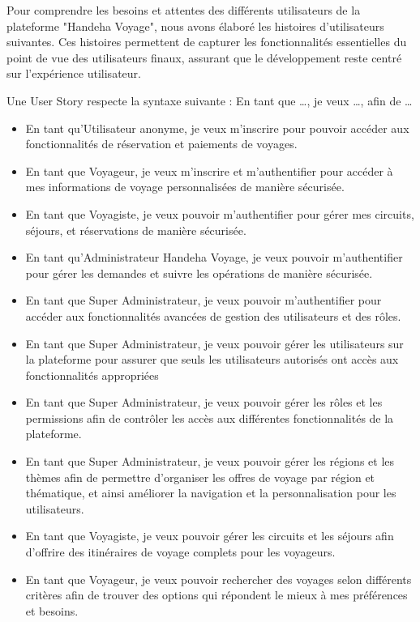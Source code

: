 \documentclass[12pt]{report}
\begin{document}
				\hspace{15pt} Pour comprendre les besoins et attentes des différents utilisateurs de la plateforme "Handeha Voyage", nous avons élaboré les histoires d’utilisateurs suivantes. Ces histoires permettent de capturer les fonctionnalités essentielles du point de vue des utilisateurs finaux, assurant que le développement reste centré sur l’expérience utilisateur. 

				Une User Story respecte la syntaxe suivante : En tant que …, je veux …, afin de …


				\begin{itemize}
					\item En tant qu'Utilisateur anonyme, je veux m'inscrire pour pouvoir accéder aux fonctionnalités de réservation et paiements de voyages. 
					\item En tant que Voyageur, je veux m'inscrire et m'authentifier pour accéder à mes informations de voyage personnalisées de manière sécurisée.
					\item En tant que Voyagiste, je veux pouvoir m'authentifier pour gérer mes circuits, séjours, et réservations de manière sécurisée.
					\item En tant qu'Administrateur Handeha Voyage, je veux pouvoir m'authentifier pour gérer les demandes et suivre les opérations de manière sécurisée.
					\item En tant que Super Administrateur, je veux pouvoir m'authentifier pour accéder aux fonctionnalités avancées de gestion des utilisateurs et des rôles.
					\item En tant que Super Administrateur, je veux pouvoir gérer les utilisateurs sur la plateforme pour assurer que seuls les utilisateurs autorisés ont accès aux fonctionnalités appropriées
					\item En tant que Super Administrateur, je veux pouvoir gérer les rôles et les permissions afin de contrôler les accès aux différentes fonctionnalités de la plateforme.
					\item En tant que Super Administrateur, je veux pouvoir gérer les régions et les thèmes afin de permettre d'organiser les offres de voyage par région et thématique, et ainsi améliorer la navigation et la personnalisation pour les utilisateurs.
					\item En tant que Voyagiste, je veux pouvoir gérer les circuits et les séjours afin d'offrire des itinéraires de voyage complets pour les voyageurs.
					\item En tant que Voyageur, je veux pouvoir rechercher des voyages selon différents critères afin de trouver des options qui répondent le mieux à mes préférences et besoins.

\end{itemize}
\end{document}
